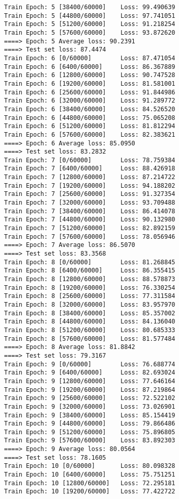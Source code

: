 \documentclass[11pt]{article}
\begin{document}
\begin{Verbatim}[commandchars=\\\{\}]
Train Epoch: 5 [38400/60000]    Loss: 99.490639
Train Epoch: 5 [44800/60000]    Loss: 97.741051
Train Epoch: 5 [51200/60000]    Loss: 91.218254
Train Epoch: 5 [57600/60000]    Loss: 93.872620
====> Epoch: 5 Average loss: 90.2391
====> Test set loss: 87.4474
Train Epoch: 6 [0/60000]        Loss: 87.471054
Train Epoch: 6 [6400/60000]     Loss: 86.367889
Train Epoch: 6 [12800/60000]    Loss: 90.747528
Train Epoch: 6 [19200/60000]    Loss: 81.581001
Train Epoch: 6 [25600/60000]    Loss: 91.844986
Train Epoch: 6 [32000/60000]    Loss: 91.289772
Train Epoch: 6 [38400/60000]    Loss: 84.526520
Train Epoch: 6 [44800/60000]    Loss: 75.065208
Train Epoch: 6 [51200/60000]    Loss: 81.812294
Train Epoch: 6 [57600/60000]    Loss: 82.383621
====> Epoch: 6 Average loss: 85.0950
====> Test set loss: 83.2832
Train Epoch: 7 [0/60000]        Loss: 78.759384
Train Epoch: 7 [6400/60000]     Loss: 88.426918
Train Epoch: 7 [12800/60000]    Loss: 87.214722
Train Epoch: 7 [19200/60000]    Loss: 94.188202
Train Epoch: 7 [25600/60000]    Loss: 91.327354
Train Epoch: 7 [32000/60000]    Loss: 93.709488
Train Epoch: 7 [38400/60000]    Loss: 86.414078
Train Epoch: 7 [44800/60000]    Loss: 90.132980
Train Epoch: 7 [51200/60000]    Loss: 82.892159
Train Epoch: 7 [57600/60000]    Loss: 78.056946
====> Epoch: 7 Average loss: 86.5070
====> Test set loss: 83.3568
Train Epoch: 8 [0/60000]        Loss: 81.268845
Train Epoch: 8 [6400/60000]     Loss: 86.355415
Train Epoch: 8 [12800/60000]    Loss: 88.578873
Train Epoch: 8 [19200/60000]    Loss: 76.330254
Train Epoch: 8 [25600/60000]    Loss: 77.311584
Train Epoch: 8 [32000/60000]    Loss: 83.957970
Train Epoch: 8 [38400/60000]    Loss: 85.357002
Train Epoch: 8 [44800/60000]    Loss: 84.136040
Train Epoch: 8 [51200/60000]    Loss: 80.685333
Train Epoch: 8 [57600/60000]    Loss: 81.577484
====> Epoch: 8 Average loss: 81.8842
====> Test set loss: 79.3167
Train Epoch: 9 [0/60000]        Loss: 76.688774
Train Epoch: 9 [6400/60000]     Loss: 82.693024
Train Epoch: 9 [12800/60000]    Loss: 77.646164
Train Epoch: 9 [19200/60000]    Loss: 87.219864
Train Epoch: 9 [25600/60000]    Loss: 72.522102
Train Epoch: 9 [32000/60000]    Loss: 73.026901
Train Epoch: 9 [38400/60000]    Loss: 85.154419
Train Epoch: 9 [44800/60000]    Loss: 79.866486
Train Epoch: 9 [51200/60000]    Loss: 75.896805
Train Epoch: 9 [57600/60000]    Loss: 83.892303
====> Epoch: 9 Average loss: 80.0564
====> Test set loss: 78.1605
Train Epoch: 10 [0/60000]       Loss: 80.098328
Train Epoch: 10 [6400/60000]    Loss: 75.751251
Train Epoch: 10 [12800/60000]   Loss: 72.295181
Train Epoch: 10 [19200/60000]   Loss: 77.422722

\end{Verbatim}
\end{document}
